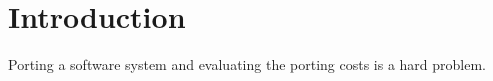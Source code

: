 \section{Introduction}

Porting a software system and evaluating the porting costs is a hard
problem.~\cite{b1,b2,b4,b5,b9,b10,b11,b12,b13,b14,b15,b16}

